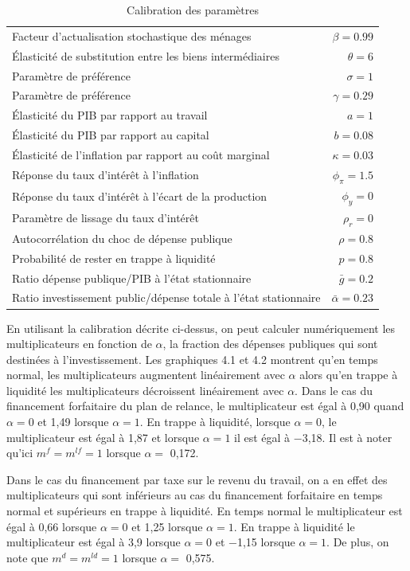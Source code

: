 \documentclass[12pt,letterpaper]{article}
\newcommand{\numtable}[2]{\renewcommand{\thetable}{#1}\caption{#2}\addtocounter{table}{-1}}
\newcommand{\gbar}{\bar{g}}
\newcommand{\abar}{\bar{\alpha}}
\begin{document}
\begin{table}[htbp]
\centering
\numtable{4.1}{Calibration des paramètres}
\begin{tabular}{lr}
\toprule
Facteur d’actualisation stochastique des ménages & $\beta = 0.99$\\
Élasticité de substitution entre les biens intermédiaires & $\theta = 6$\\
Paramètre de préférence & $\sigma = 1$\\
Paramètre de préférence & $\gamma = 0.29$\\
Élasticité du PIB par rapport au travail & $a = 1$\\
Élasticité du PIB par rapport au capital & $b = 0.08$\\
Élasticité de l’inflation par rapport au coût marginal & $\kappa = 0.03$\\
Réponse du taux d’intérêt à l’inflation & $\phi_\pi = 1.5$\\
Réponse du taux d’intérêt à l’écart de la production & $\phi_y = 0$\\
Paramètre de lissage du taux d’intérêt & $\rho_r = 0$\\
Autocorrélation du choc de dépense publique & $\rho = 0.8$\\
Probabilité de rester en trappe à liquidité & $p = 0.8$\\
Ratio dépense publique/PIB à l’état stationnaire & $\gbar = 0.2$\\
Ratio investissement public/dépense totale à l’état stationnaire & $\abar = 0.23$\\
\bottomrule
\end{tabular}
\end{table}

En utilisant la calibration décrite ci-dessus, on peut calculer numériquement les multiplicateurs en fonction de $\alpha$, la fraction des dépenses publiques qui sont destinées à l’investissement. Les graphiques 4.1 et 4.2 montrent qu’en temps normal, les multiplicateurs augmentent linéairement avec $\alpha$ alors qu’en trappe à liquidité les multiplicateurs décroissent linéairement avec $\alpha$. Dans le cas du financement forfaitaire du plan de relance, le multiplicateur est égal à 0,90 quand $\alpha = 0$ et 1,49 lorsque $\alpha = 1$. En trappe à liquidité, lorsque $\alpha = 0$, le multiplicateur est égal à 1,87 et lorsque $\alpha = 1$ il est égal à −3,18. Il est à noter qu’ici $m^f = m^{lf} = 1$ lorsque $\alpha =$ 0,172.

Dans le cas du financement par taxe sur le revenu du travail, on a en effet des multiplicateurs qui sont inférieurs au cas du financement forfaitaire en temps normal et supérieurs en trappe à liquidité. En temps normal le multiplicateur est égal à 0,66 lorsque $\alpha = 0$ et 1,25 lorsque $\alpha = 1$. En trappe à liquidité le multiplicateur est égal à 3,9 lorsque $\alpha = 0$ et −1,15 lorsque $\alpha = 1$. De plus, on note que $m^d = m^{ld} = 1$ lorsque $\alpha =$ 0,575.
\end{document}
